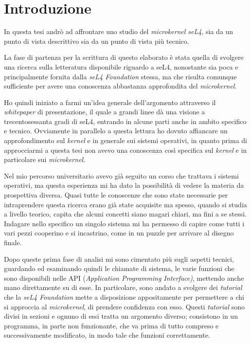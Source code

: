 \chapter{Introduzione}
In questa tesi andrò ad affrontare uno studio del \textit{microkernel seL4}, sia da un punto di vista descrittivo sia da un punto di vista più tecnico.

La fase di partenza per la scrittura di questo elaborato è stata quella di svolgere una ricerca sulla letteratura disponibile riguardo a seL4, nonostante sia poca e principalmente fornita dalla \textit{seL4 Foundation} stessa, ma che risulta comunque sufficiente per avere una conoscenza abbastanza approfondita del \textit{microkernel}.

Ho quindi iniziato a farmi un'idea generale dell'argomento attraverso il \textit{whitepaper} \cite{sel4-whitepaper} di presentazione, il quale a grandi linee dà una visione a trecentosessanta gradi di seL4, entrando in alcune parti anche in ambito specifico e tecnico. Ovviamente in parallelo a questa lettura ho dovuto affiancare un approfondimento sul \textit{kernel} e in generale sui sistemi operativi, in quanto prima di approcciarmi a questa tesi non avevo una conoscenza così specifica sul \textit{kernel} e in particolare sui \textit{microkernel}.

Nel mio percorso universitario avevo già seguito un corso che trattava i sistemi operativi, ma questa esperienza mi ha dato la possibilità di vedere la materia da prospettiva diversa. Quasi tutte le conoscenze che sono state necessarie per intraprendere questa ricerca erano già state acquisite ma spesso, quando si studia a livello teorico, capita che alcuni concetti siano magari chiari, ma fini a se stessi. Indagare nello specifico un singolo sistema mi ha permesso di capire come tutti i vari pezzi cooperino e si incastrino, come in un puzzle per arrivare al disegno finale.

Dopo queste prima fase di analisi mi sono cimentato più sugli aspetti tecnici, guardando ed esaminando quindi le chiamate di sistema, le varie funzioni che sono disponibili nelle API (\textit{Application Programming Interface)}, mettendo anche mano direttamente su di esse. In particolare, sono andato a svolgere dei \textit{tutorial} che la \textit{seL4 Foundation} mette a disposizione appositamente per permettere a chi si approccia al \textit{microkernel}, di prendere confidenza con esso. Questi \textit{tutorial} sono divisi in sezioni e ognuno di essi tratta un argomento diverso; consistono in un programma, in parte non funzionante, che va prima di tutto compreso e successivamente modificato, in modo tale che funzioni correttamente.

